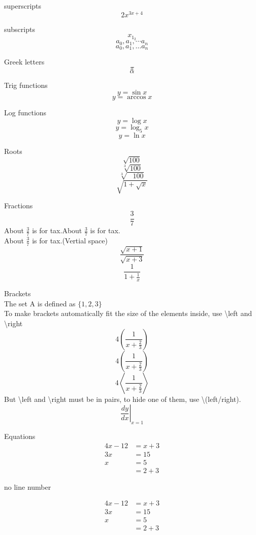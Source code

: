 \documentclass[11pt]{article}
\begin{document}
superscripts
$$2x^{3x+4}$$

subscripts
$$x_{1_2}$$
$$a_0, a_1,\cdots a_n$$
$$a_0, a_1,\ldots a_n$$

Greek letters
$$\pi$$
$$\alpha$$

Trig functions
$$y=\sin x$$
$$y=\arccos x$$

Log functions
$$y=\log x$$
$$y=\log_{5} x$$
$$y=\ln x$$

Roots
$$\sqrt{100}$$
$$\sqrt[3]{100}$$
$$\sqrt[3]{\,\,\,\,\,100}$$
$$\sqrt{   1+\sqrt{x}   }$$

Fractions
$$\frac{3}{7}$$
About $\displaystyle \frac{3}{7}$ is for tax.About $\frac{3}{7}$ is for tax.\\[6pt]
About $\frac{3}{7}$ is for tax.(Vertial space)
$$\frac{\sqrt{x+1}}{\sqrt{x+3}}$$
$$\frac{1}{   1+\frac{1}{x}   }$$

Brackets\\
The set A is defined as $\{1, 2, 3\}$\\
To make brackets automatically fit the size of the elements inside, use \textbackslash left and \textbackslash right
$$4(\frac{1}{x+\frac{2}{3}})$$
$$4\left(\frac{1}{x+\frac{2}{3}}\right)$$
$$4\left\langle\frac{1}{x+\frac{2}{3}}\right\rangle$$
But \textbackslash left and \textbackslash right must be in pairs, to hide one of them, use \textbackslash (left/right).
$$\left.\frac{dy}{dx}\right|_{x=1}$$

Equations
\begin{align}
4x-12&=x+3\\
3x&=15\\
x&=5\\
&=2+3
\end{align}

no line number

\begin{align*}
4x-12&=x+3\\
3x&=15\\
x&=5\\
&=2+3
\end{align*}
\end{document}
